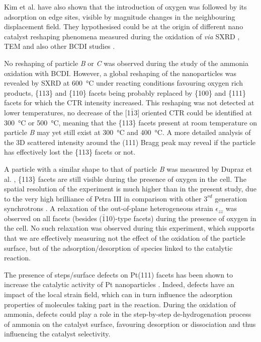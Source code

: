 Kim et al. \parencite*{Kim2018} have also shown that the introduction of oxygen was followed by its adsorption on edge sites, visible by magnitude changes in the neighbouring displacement field.
They hypothesised could be at the origin of different nano catalyst reshaping phenomena measured during the oxidation of  \textit{via} SXRD \parencite{Nolte2008, Hejral2016}, TEM \parencite{Vendelbo2014} and also other BCDI studies \parencite{Abuin2019}.

No reshaping of particle \textit{B} or \textit{C} was observed during the study of the ammonia oxidation with BCDI.
However, a global reshaping of the nanoparticles was revealed by SXRD at \qty{600}{\degreeCelsius} under reacting conditions favouring oxygen rich products, \{113\} and \{110\} facets being probably replaced by \{100\} and \{111\} facets for which the CTR intensity increased.
This reshaping was not detected at lower temperatures, no decrease of the [1$\bar{1}$3] oriented CTR could be identified at \qty{300}{\degreeCelsius} or \qty{500}{\degreeCelsius}, meaning that the \{113\} facets present at room temperature on particle \textit{B} may yet still exist at \qty{300}{\degreeCelsius} and \qty{400}{\degreeCelsius}.
A more detailed analysis of the 3D scattered intensity around the (111) Bragg peak may reveal if the particle has effectively lost the \{113\} facets or not.

A particle with a similar shape to that of particle \textit{B} was measured by Dupraz et al. \parencite*{Dupraz2022}, \{113\} facets are still visible during the presence of oxygen in the cell.
The spatial resolution of the experiment is much higher than in the present study, due to the very high brilliance of Petra III in comparison with other $3^{rd}$ generation synchrotrons \parencite{Bilderback2005}.
A relaxation of the out-of-plane heterogeneous strain $\epsilon_{zz}$ was observed on all facets (besides ($\bar{1}$10)-type facets) during the presence of oxygen in the cell.
No such relaxation was observed during this experiment, which supports that we are effectively measuring not the effect of the oxidation of the particle surface, but of the adsorption/desorption of species linked to the catalytic reaction.

The presence of steps/surface defects on Pt(111) facets has been shown to increase the catalytic activity of Pt nanoparticles \parencite{Segner1984, Chen2012}.
Indeed, defects have an impact of the local strain field, which can in turn influence the adsorption properties of molecules taking part in the reaction.
During the oxidation of ammonia, defects could play a role in the step-by-step de-hydrogenation process of ammonia on the catalyst surface, favouring  desorption or dissociation and thus influencing the catalyst selectivity.

